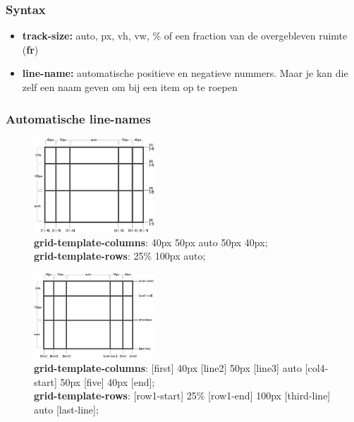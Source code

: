 \documentclass{article}
\newcommand{\bold}[1]{\textbf{#1}}
\begin{document}
\subsubsection{Syntax}

\begin{itemize}
    \item \bold{track-size:} auto, px, vh, vw, \% of een fraction van de overgebleven ruimte (\bold{fr})
    \item \bold{line-name:} automatische positieve en negatieve nummers. Maar je kan die zelf een naam geven om bij een item op te roepen
\end{itemize}

\subsubsection{Automatische line-names}

\begin{figure}[H]
    \centering
    \includegraphics[width=0.4\textwidth]{grid-template.png}
    \caption{\bold{grid-template-columns}: 40px 50px auto 50px 40px; \\\bold{grid-template-rows}: 25\% 100px auto;}
\end{figure}

\begin{figure}[H]
    \centering
    \includegraphics[width=0.4\textwidth]{grid-template-lines.png}
    \caption{\bold{grid-template-columns}: [first] 40px [line2] 50px [line3] auto [col4-start] 50px [five] 40px [end]; \\\bold{grid-template-rows}: [row1-start] 25\% [row1-end] 100px [third-line] auto [last-line];}
\end{figure}
\end{document}
